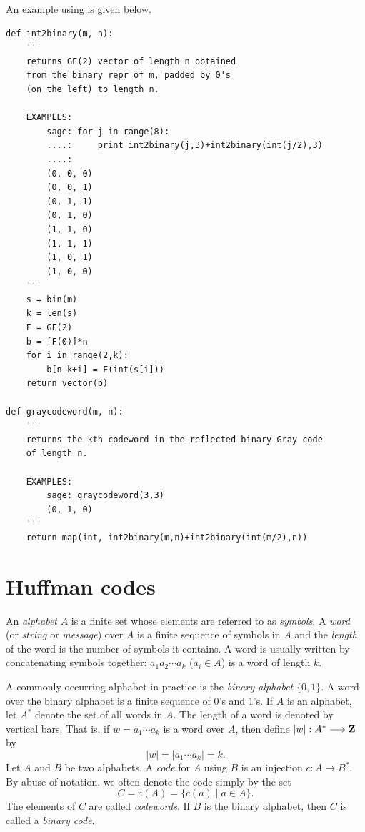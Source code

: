 An example using \sage is given below.

\begin{lstlisting}
def int2binary(m, n):
    '''
    returns GF(2) vector of length n obtained
    from the binary repr of m, padded by 0's
    (on the left) to length n.

    EXAMPLES:
        sage: for j in range(8):
        ....:     print int2binary(j,3)+int2binary(int(j/2),3)
        ....:
        (0, 0, 0)
        (0, 0, 1)
        (0, 1, 1)
        (0, 1, 0)
        (1, 1, 0)
        (1, 1, 1)
        (1, 0, 1)
        (1, 0, 0)
    '''
    s = bin(m)
    k = len(s)
    F = GF(2)
    b = [F(0)]*n
    for i in range(2,k):
        b[n-k+i] = F(int(s[i]))
    return vector(b)

def graycodeword(m, n):
    '''
    returns the kth codeword in the reflected binary Gray code
    of length n.

    EXAMPLES:
        sage: graycodeword(3,3)
        (0, 1, 0)
    '''
    return map(int, int2binary(m,n)+int2binary(int(m/2),n))
\end{lstlisting}



\section{Huffman codes}
\label{sec:trees_forests:Huffman_codes}

An \emph{alphabet} $A$ is a finite set whose elements
are referred to as \emph{symbols}. A \emph{word} (or
\emph{string} or \emph{message}) over $A$
is a finite sequence of symbols in $A$ and the \emph{length} of the
word is the number of symbols it contains. A word is usually written
by concatenating symbols together: $a_1 a_2 \cdots a_k$ ($a_i \in A$)
is a word of length $k$.

A commonly occurring alphabet in practice is the \emph{binary alphabet}
$\{0,1\}$. A word over the binary alphabet is a finite sequence of
$0$'s and $1$'s. If $A$ is an alphabet, let $A^*$ denote the set of
all words in $A$. The length of a word is denoted by vertical
bars. That is, if $w = a_1 \cdots a_k$ is a word over $A$, then define
$|w|: A^* \longrightarrow \mathbf{Z}$ by
\[
|w|
=
|a_1 \cdots a_k|
=
k.
\]
Let $A$ and $B$ be two alphabets. A \emph{code} for $A$
using $B$ is an injection $c: A \longrightarrow B^*$. By abuse of
notation, we often denote the code simply by the set
\[
C
=
c(A)
=
\{c(a) \;|\; a \in A\}.
\]
The elements of $C$ are called \emph{codewords}. If
$B$ is the binary alphabet, then $C$ is called a
\emph{binary code}.


